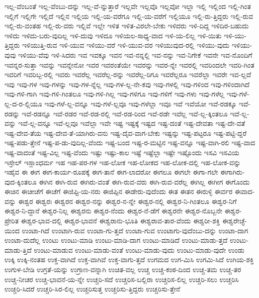 {ಇಲ್ಲ-ವೆಂಬಂತೆ
ಇಲ್ಲ-ವೆಂಬು-ದನ್ನು
ಇಲ್ಲ-ವೆ-ನ್ನುತ್ತಾರೆ
ಇಲ್ಲವೇ
ಇಲ್ಲವೊ
ಇಲ್ಲವೋ
ಇಲ್ಲಾ
ಇಲ್ಲಿ
ಇಲ್ಲಿಂದ
ಇಲ್ಲಿ-ಗಿಂತ
ಇಲ್ಲಿಗೆ
ಇಲ್ಲಿಗೇ
ಇಲ್ಲಿದೆ
ಇಲ್ಲಿನ
ಇಲ್ಲಿಯ
ಇಲ್ಲಿ-ಯ-ವರೆಗೂ
ಇಲ್ಲಿ-ಯ-ವರೆಗೆ
ಇಲ್ಲಿಯೂ
ಇಲ್ಲಿ-ರು-ತ್ತಿದ್ದರು
ಇಲ್ಲಿ-ರುವ
ಇಲ್ಲಿ-ರು-ವಂತಹ
ಇಲ್ಲಿ-ರು-ವರು
ಇಲ್ಲಿವೆ
ಇಲ್ಲೇ
ಇಳಿತ
ಇಳಿತ-ವಿರಲೇ-ಬೇಕು
ಇಳಿದರು
ಇಳಿ-ದಿದ್ದ
ಇಳಿದಿರ-ಬಹುದು
ಇಳಿದು
ಇಳಿದು-ಬರು-ವುದಿಲ್ಲ
ಇಳಿ-ದುವು
ಇಳಿದೂ
ಇಳಿಯಲ-ಸಾಧ್ಯ-ವಾದ
ಇಳಿ-ಯ-ಲಿಲ್ಲ
ಇಳಿ-ಯಿತು
ಇಳಿ-ಯು-ತ್ತಿದ್ದರು
ಇಳಿಯುತ್ತಿ-ರುವ
ಇಳಿ-ಯುವ
ಇಳಿಯು-ವರೆ
ಇಳಿ-ಯುವ-ವರ
ಇಳಿಯುವುದ-ರಲ್ಲಿ
ಇಳಿಯು-ವುದು
ಇಳಿಯು-ವುವು
ಇಳಿಯು-ವೆವು
ಇಳಿ-ಸಿದರು
ಇವ
ಇವಕ್ಕೂ
ಇವನ
ಇವ-ನನ್ನಲ್ಲಿ
ಇವ-ನನ್ನು
ಇವ-ನಿಗೇಕೆ
ಇವನೇ
ಇವ-ನೊಂದಿಗೆ
ಇವನ್ನರ-ಸುತ್ತಾ
ಇವನ್ನು
ಇವನ್ನೇನೋ
ಇವರ
ಇವರಂತೆಯೇ
ಇವರನ್ನು
ಇವರ-ನ್ನೇ
ಇವರಲ್ಲಿ
ಇವರಿಂದಲೇ
ಇವರಿ-ಗಿಂತ
ಇವರಿಗೆ
ಇವರಿಬ್ಬ-ರಲ್ಲಿ
ಇವರು
ಇವರೆಲ್ಲ
ಇವರೆಲ್ಲ-ರನ್ನು
ಇವರೆಲ್ಲ-ರಿಗೂ
ಇವರೆಲ್ಲರೂ
ಇವರೆಲ್ಲಾ
ಇವರೇ
ಇವ-ಲ್ಲದೆ
ಇವು
ಇವು-ಗಳ
ಇವು-ಗಳನ್ನು
ಇವು-ಗಳ-ನ್ನೆಲ್ಲ
ಇವು-ಗಳ-ಲ್ಲ-ನೇ-ಕವು
ಇವು-ಗಳಲ್ಲಿ
ಇವು-ಗಳಿಂದ
ಇವು-ಗಳಿಂದಾಗಿದೆ
ಇವು-ಗಳಿ-ಗಾಗಿ
ಇವು-ಗಳಿ-ಗಿಂತಲೂ
ಇವು-ಗಳಿ-ಗಿಲ್ಲ
ಇವು-ಗಳಿಗೂ
ಇವು-ಗಳಿಗೆ
ಇವು-ಗಳು
ಇವು-ಗಳೆಲ್ಲ
ಇವು-ಗಳೆ-ಲ್ಲ-ದ-ರ-ಲ್ಲಿಯೂ
ಇವು-ಗಳೆ-ಲ್ಲ-ವನ್ನೂ
ಇವು-ಗಳೆ-ಲ್ಲವೂ
ಇವು-ಗಳೆಲ್ಲಾ
ಇವೂ
ಇವೆ
ಇವೆಯೋ
ಇವೆ-ರಡಕ್ಕೂ
ಇವೆ-ರಡನ್ನು
ಇವೆ-ರಡನ್ನೂ
ಇವೆ-ರಡರ
ಇವೆ-ರಡ-ರಲ್ಲಿ
ಇವೆ-ರಡ-ರಿಂದ
ಇವೆ-ರಡೇ
ಇವೆಲ್ಲ
ಇವೆ-ಲ್ಲ-ಕ್ಕಿಂತಲೂ
ಇವೆ-ಲ್ಲ-ವನ್ನು
ಇವೆ-ಲ್ಲ-ವನ್ನೂ
ಇವೆ-ಲ್ಲವೂ
ಇವೆಲ್ಲಾ
ಇವೇ
ಇಷ್ಟ
ಇಷ್ಟಕ್ಕೆ
ಇಷ್ಟದ
ಇಷ್ಟ-ದಂತೆ
ಇಷ್ಟ-ದೇವತಾ
ಇಷ್ಟ-ದೇ-ವತೆ
ಇಷ್ಟ-ದೇವ-ತೆಯ
ಇಷ್ಟ-ದೇವ-ತೆ-ಯಾಗಿರು-ವನು
ಇಷ್ಟ-ದೈವ-ವಾಗ-ಬೇಕು
ಇಷ್ಟನ್ನು
ಇಷ್ಟ-ಪಟ್ಟರೂ
ಇಷ್ಟ-ಪಟ್ಟಿ-ದ್ದರೆ
ಇಷ್ಟ-ಪಡು-ತ್ತೇನೆ
ಇಷ್ಟ-ಪ-ಡು-ವುದಿಲ್ಲ-ವೆಂದು
ಇಷ್ಟ-ಬಂದ
ಇಷ್ಟ-ರ-ಮಟ್ಟಿನ
ಇಷ್ಟ-ವನ್ನೂ
ಇಷ್ಟ-ವಾಗಿ-ರಲಿ
ಇಷ್ಟ-ವಾದ
ಇಷ್ಟ-ವಾದಂತೆ
ಇಷ್ಟ-ವಿಲ್ಲ
ಇಷ್ಟ-ವೆಂದು
ಇಷ್ಟು
ಇಷ್ಟು-ಕಾಲ
ಇಷ್ಟೆ
ಇಷ್ಟೆಲ್ಲಾ
ಇಷ್ಟೇ
ಇಷ್ಟೊಂದು
ಇಸವಿ
ಇಸವಿಯ
ಇಸ್ರೇಲ್
ಇಸ್ಲಾಂಧರ್ಮ
ಇಹ
ಇಹ-ಪರ-ಗಳ
ಇಹ-ಲೋಕ
ಇಹ-ಲೋಕದ
ಇಹ-ಲೋಕ-ದಲ್ಲಿ
ಇಹ-ಲೋಕ-ವನ್ನು
ಇಹೈವ
ಈ
ಈಗ
ಈಗ-ಕಾರ್ಯ-ರೂಪಕ್ಕೆ
ಈಗ-ತಾನೆ
ಈಗ-ಲಾದರೋ
ಈಗಲೂ
ಈಗಲೇ
ಈಗಾ-ಗಲೇ
ಈಗಾಗಿರು-ವುದ-ಕ್ಕಿಂತಲೂ
ಈಗಿನ
ಈಗಿ-ರುವ
ಈಗಿರು-ವಂತೆ
ಈಗಿ-ರುವ-ವರು
ಈಗಿ-ರುವ-ವರೆಲ್ಲ
ಈಗಿಲ್ಲ
ಈಗೀಗ
ಈಗೊಂದು
ಈಚಿನ
ಈಚೀಚೆಗೆ
ಈಚೆಗೆ
ಈಜಿಪ್ಟಿ-ಯ-ನರು
ಈಜಿಪ್ಪಿನ
ಈಡೇರು-ವುದೆಂದು
ಈತ
ಈತನ
ಈರುಳ್ಳಿ
ಈರ್ವರ
ಈವಾದ-ವನ್ನು
ಈಶ್ವರ
ಈಶ್ವರಃ
ಈಶ್ವರನ
ಈಶ್ವರ-ನನ್ನು
ಈಶ್ವರ-ನ-ನ್ನೇ
ಈಶ್ವರ-ನಲ್ಲಿ
ಈಶ್ವರ-ನಿ-ಗಿಂತಲೂ
ಈಶ್ವರ-ನಿಗೆ
ಈಶ್ವರ-ನಿ-ದ್ದಾನೆ
ಈಶ್ವರ-ನಿಲ್ಲ
ಈಶ್ವರನು
ಈಶ್ವರ-ನೆಂದು
ಈಶ್ವರ-ನೆ-ಡೆಗೆ
ಈಶ್ವರನೇ
ಈಶ್ವರ-ನೊಬ್ಬನೇ
ಈಶ್ವರ-ಪ್ರೇರಿತ
ಈಶ್ವರ-ಭಾವ-ದಲ್ಲಿ
ಈಶ್ವರ-ಭಾವನೆ
ಈಶ್ವರಾನು-ಭೂತಿ
ಈಶ್ವರಾವ-ತಾರ-ವೆಂದು
ಈಶ್ವರೀ-ಶಕ್ತಿ
ಈಶ್ವರೇಚ್ಛೆ-ಯಿಂದ
ಉಂಟಾ-ಗಿದೆ
ಉಂಟಾಗಿ-ರುವ
ಉಂಟಾ-ಗು-ತ್ತದೆ
ಉಂಟಾ-ಗುವ
ಉಂಟಾಗು-ವುದೆಂಬು-ದನ್ನು
ಉಂಟಾ-ದಾಗ
ಉಂಟಾ-ದುದೆಲ್ಲ
ಉಂಟು
ಉಂಟು-ಮಾಡಿ
ಉಂಟು-ಮಾಡಿ-ದಾಗ
ಉಂಟು-ಮಾಡಿದೆ
ಉಂಟು-ಮಾಡು-ತ್ತದೆ
ಉಂಟು-ಮಾಡು-ತ್ತಿದೆ
ಉಂಟು-ಮಾಡುವ
ಉಂಟು-ಮಾಡು-ವಂತೆ
ಉಂಟು-ಮಾಡು-ವುದು
ಉಂಟು-ಮಾಡು-ವುದೇ
ಉಂಡು
ಉಕ್ಕಿ
ಉಕ್ಕಿ-ನಂತಹ
ಉಕ್ತ-ವಾಗಿದೆ
ಉಕ್ತ-ವಾಗಿವೆ
ಉಕ್ತ-ವಾಗು-ತ್ತದೆ
ಉಗಮದ
ಉಗ-ಮಿಸಿ
ಉಗಮಿ-ಸಿದೆ
ಉಗಿಯ-ಶಕ್ತಿ
ಉಗುಳ-ಬೇಡಿ
ಉಗ್ರತೆ-ಯನ್ನು
ಉಗ್ರಾಣ-ವನ್ನಾಗಿ
ಉಚಿತ-ವಲ್ಲ
ಉಚ್ಚ
ಉಚ್ಚ-ಕಂಠ-ದಿಂದ
ಉಚ್ಚ-ತಮ
ಉಚ್ಚ-ತರ
ಉಚ್ಚ-ನೀಚರ
ಉಚ್ಚ-ಭಾವನೆ-ಯ-ನ್ನೇ
ಉಚ್ಚರಿ-ಸದೆ
ಉಚ್ಚರಿಸ-ಬಲ್ಲಿರಾ
ಉಚ್ಚರಿಸ-ಲಿಲ್ಲ
ಉಚ್ಚರಿ-ಸಲು
ಉಚ್ಚರಿಸಿ
ಉಚ್ಚರಿ-ಸಿದರೆ
ಉಚ್ಚರಿ-ಸಿರ-ಲಿಲ್ಲ
ಉಚ್ಚರಿಸುತ್ತ
ಉಚ್ಚರಿಸು-ತ್ತಿದ್ದರು
ಉಚ್ಚರಿಸು-ತ್ತೇನೆ
}
